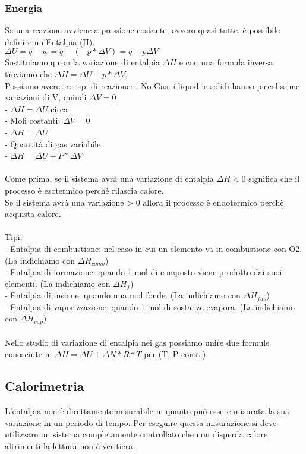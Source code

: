\subsubsection{Energia}
Se una reazione avviene a pressione costante, ovvero quasi tutte, è possibile definire un'Entalpia (H).\\
$\Delta U = q+w = q+(-p*\Delta V) = q-p\Delta V$\\
Sostituiamo q con la variazione di entalpia $\Delta H$ e con una formula inversa troviamo che $\Delta H =\Delta U + p * \Delta V$.\\
Possiamo avere tre tipi di reazione:
\tab- No Gas: i liquidi e solidi hanno piccolissime variazioni di V, quindi $\Delta V = 0$\\
\tab\tab- $\Delta H =\Delta U$ circa\\
\tab- Moli costanti: $\Delta V = 0$\\
\tab\tab- $\Delta H = \Delta U$\\
\tab- Quantità di gas variabile\\
\tab\tab- $\Delta H = \Delta U + P*\Delta V$\\\\
Come prima, se il sistema avrà una variazione di entalpia $\Delta H < 0$ significa che il processo è esotermico perchè rilascia calore.\\
Se il sistema avrà una variazione > 0 allora il processo è endotermico perchè acquista calore.\\\\
Tipi:\\
\tab- Entalpia di combustione: nel caso in cui un elemento va in combustione con O2. (La indichiamo con $\Delta H_{comb}$)\\
\tab- Entalpia di formazione: quando 1 mol di composto viene prodotto dai suoi elementi. (La indichiamo con $\Delta H_f$)\\
\tab- Entalpia di fusione: quando una mol fonde. (La indichiamo con $\Delta H_{fus}$)\\
\tab- Entalpia di vaporizzazione: quando 1 mol di sostanze evapora. (La indichiamo con $\Delta H_{vap}$)\\\\
Nello studio di variazione di entalpia nei gas possiamo unire due formule conosciute in $\Delta H = \Delta U + \Delta N * R * T$ per (T, P const.)
\subsection{Calorimetria}
L'entalpia non è direttamente misurabile in quanto può essere misurata la sua variazione in un periodo di tempo. Per eseguire questa misurazione si deve utilizzare un sistema completamente controllato che non disperda calore, altrimenti la lettura non è veritiera.
